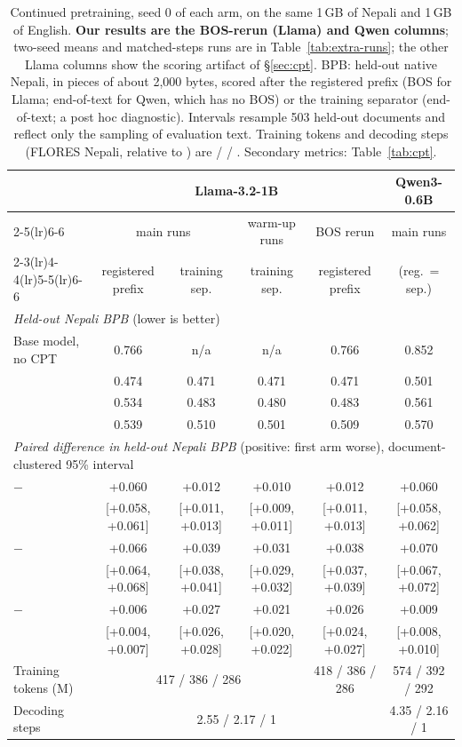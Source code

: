 \begin{table}[t]
\centering\small
\setlength{\tabcolsep}{4.5pt}
\begin{tabular}{lccccc}
\toprule
 & \multicolumn{4}{c}{Llama-3.2-1B} & Qwen3-0.6B \\
\cmidrule(lr){2-5}\cmidrule(lr){6-6}
 & \multicolumn{2}{c}{main runs} & warm-up runs & BOS rerun & main runs \\
\cmidrule(lr){2-3}\cmidrule(lr){4-4}\cmidrule(lr){5-5}\cmidrule(lr){6-6}
 & registered prefix & training sep. & training sep. & registered prefix & (reg.\ = sep.) \\
\midrule
\multicolumn{6}{l}{\emph{Held-out Nepali BPB} (lower is better)} \\
Base model, no CPT & 0.766 & n/a & n/a & 0.766 & 0.852 \\
\RO{} & 0.474 & 0.471 & 0.471 & 0.471 & 0.501 \\
\RI{} & 0.534 & 0.483 & 0.480 & 0.483 & 0.561 \\
\RII{} & 0.539 & 0.510 & 0.501 & 0.509 & 0.570 \\
\midrule
\multicolumn{6}{l}{\emph{Paired difference in held-out Nepali BPB} (positive: first arm worse), document-clustered 95\% interval} \\
\RI{} $-$ \RO{} & +0.060 & +0.012 & +0.010 & +0.012 & +0.060 \\
 & [+0.058, +0.061] & [+0.011, +0.013] & [+0.009, +0.011] & [+0.011, +0.013] & [+0.058, +0.062] \\[2pt]
\RII{} $-$ \RO{} & +0.066 & +0.039 & +0.031 & +0.038 & +0.070 \\
 & [+0.064, +0.068] & [+0.038, +0.041] & [+0.029, +0.032] & [+0.037, +0.039] & [+0.067, +0.072] \\[2pt]
\RII{} $-$ \RI{} & +0.006 & +0.027 & +0.021 & +0.026 & +0.009 \\
 & [+0.004, +0.007] & [+0.026, +0.028] & [+0.020, +0.022] & [+0.024, +0.027] & [+0.008, +0.010] \\
\midrule
Training tokens (M) & \multicolumn{3}{c}{417 / 386 / 286} & 418 / 386 / 286 & 574 / 392 / 292 \\
Decoding steps & \multicolumn{4}{c}{2.55 / 2.17 / 1} & 4.35 / 2.16 / 1 \\
\bottomrule
\end{tabular}
\caption{Continued pretraining, seed 0 of each arm, on the same 1\,GB of Nepali and 1\,GB of English. \textbf{Our results are the BOS-rerun (Llama) and Qwen columns}; two-seed means and matched-steps runs are in Table~\ref{tab:extra-runs}; the other Llama columns show the scoring artifact of \S\ref{sec:cpt}. BPB: held-out native Nepali, in pieces of about 2{,}000 bytes, scored after the registered prefix (BOS for Llama; end-of-text for Qwen, which has no BOS) or the training separator (end-of-text; a post hoc diagnostic). Intervals resample 503 held-out documents and reflect only the sampling of evaluation text. Training tokens and decoding steps (FLORES Nepali, relative to \RII{}) are \RO{} / \RI{} / \RII{}. Secondary metrics: Table~\ref{tab:cpt}.}
\label{tab:prefix}
\end{table}
